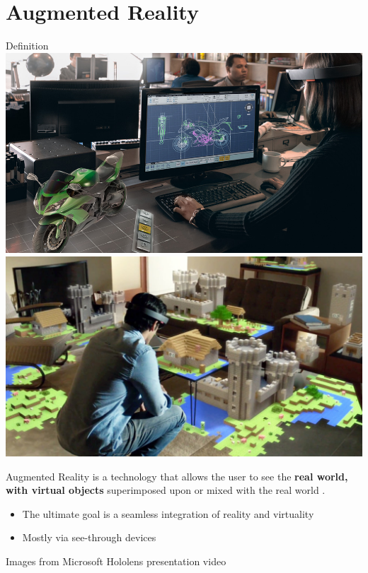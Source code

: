 \documentclass[presentation]{beamer} %
\begin{document}
\section{Augmented Reality}
\begin{frame}{Definition}
  \includegraphics[width=.49\textwidth]{images/holobike}
  \includegraphics[width=.49\textwidth]{images/holominecraft}
  \begin{block}{Augmented Reality}
    is a technology that allows the user to see the \textbf{real world, with virtual objects} superimposed upon or mixed with the real world \cite{Azuma97}.
    \begin{itemize}
      \item The ultimate goal is a seamless integration of reality and virtuality
      \item Mostly via see-through devices
    \end{itemize}
  \end{block}
  \begin{center}
    \tiny{Images from Microsoft Hololens presentation video}
  \end{center}
\end{frame}
\end{document}
